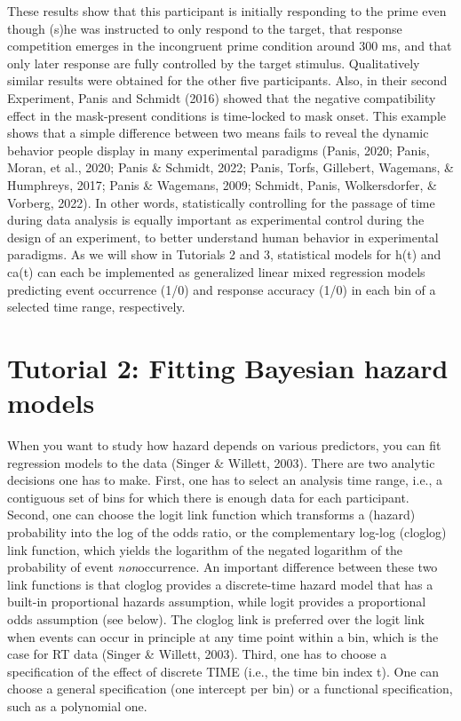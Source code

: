 \documentclass[
  man,floatsintext]{apa6}
\begin{document}
These results show that this participant is initially responding to the prime even though (s)he was instructed to only respond to the target, that response competition emerges in the incongruent prime condition around 300 ms, and that only later response are fully controlled by the target stimulus. Qualitatively similar results were obtained for the other five participants. Also, in their second Experiment, Panis and Schmidt (2016) showed that the negative compatibility effect in the mask-present conditions is time-locked to mask onset. This example shows that a simple difference between two means fails to reveal the dynamic behavior people display in many experimental paradigms (Panis, 2020; Panis, Moran, et al., 2020; Panis \& Schmidt, 2022; Panis, Torfs, Gillebert, Wagemans, \& Humphreys, 2017; Panis \& Wagemans, 2009; Schmidt, Panis, Wolkersdorfer, \& Vorberg, 2022). In other words, statistically controlling for the passage of time during data analysis is equally important as experimental control during the design of an experiment, to better understand human behavior in experimental paradigms. As we will show in Tutorials 2 and 3, statistical models for h(t) and ca(t) can each be implemented as generalized linear mixed regression models predicting event occurrence (1/0) and response accuracy (1/0) in each bin of a selected time range, respectively.

\section{Tutorial 2: Fitting Bayesian hazard models}\label{tutorial-2-fitting-bayesian-hazard-models}

When you want to study how hazard depends on various predictors, you can fit regression models to the data (Singer \& Willett, 2003). There are two analytic decisions one has to make. First, one has to select an analysis time range, i.e., a contiguous set of bins for which there is enough data for each participant. Second, one can choose the logit link function which transforms a (hazard) probability into the log of the odds ratio, or the complementary log-log (cloglog) link function, which yields the logarithm of the negated logarithm of the probability of event \emph{non}occurrence. An important difference between these two link functions is that cloglog provides a discrete-time hazard model that has a built-in proportional hazards assumption, while logit provides a proportional odds assumption (see below). The cloglog link is preferred over the logit link when events can occur in principle at any time point within a bin, which is the case for RT data (Singer \& Willett, 2003). Third, one has to choose a specification of the effect of discrete TIME (i.e., the time bin index t). One can choose a general specification (one intercept per bin) or a functional specification, such as a polynomial one.
\end{document}
